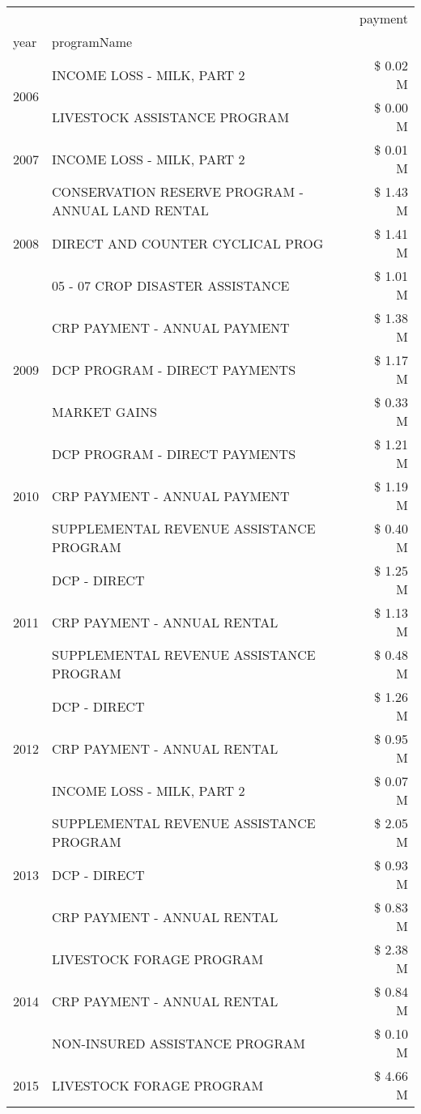 \begin{tabular}{llr}
\toprule
 &  & payment \\
year & programName &  \\
\midrule
\multirow[t]{2}{*}{2006} & INCOME LOSS - MILK, PART 2 & \$ 0.02 M \\
 & LIVESTOCK ASSISTANCE PROGRAM & \$ 0.00 M \\
\cline{1-3}
2007 & INCOME LOSS - MILK, PART 2 & \$ 0.01 M \\
\cline{1-3}
\multirow[t]{3}{*}{2008} & CONSERVATION RESERVE PROGRAM - ANNUAL LAND RENTAL & \$ 1.43 M \\
 & DIRECT AND COUNTER CYCLICAL PROG & \$ 1.41 M \\
 & 05 - 07 CROP DISASTER ASSISTANCE & \$ 1.01 M \\
\cline{1-3}
\multirow[t]{3}{*}{2009} & CRP PAYMENT - ANNUAL PAYMENT & \$ 1.38 M \\
 & DCP PROGRAM - DIRECT PAYMENTS & \$ 1.17 M \\
 & MARKET GAINS & \$ 0.33 M \\
\cline{1-3}
\multirow[t]{3}{*}{2010} & DCP PROGRAM - DIRECT PAYMENTS & \$ 1.21 M \\
 & CRP PAYMENT - ANNUAL PAYMENT & \$ 1.19 M \\
 & SUPPLEMENTAL REVENUE ASSISTANCE PROGRAM & \$ 0.40 M \\
\cline{1-3}
\multirow[t]{3}{*}{2011} & DCP - DIRECT & \$ 1.25 M \\
 & CRP PAYMENT - ANNUAL RENTAL & \$ 1.13 M \\
 & SUPPLEMENTAL REVENUE ASSISTANCE PROGRAM & \$ 0.48 M \\
\cline{1-3}
\multirow[t]{3}{*}{2012} & DCP - DIRECT & \$ 1.26 M \\
 & CRP PAYMENT - ANNUAL RENTAL & \$ 0.95 M \\
 & INCOME LOSS - MILK, PART 2 & \$ 0.07 M \\
\cline{1-3}
\multirow[t]{3}{*}{2013} & SUPPLEMENTAL REVENUE ASSISTANCE PROGRAM & \$ 2.05 M \\
 & DCP - DIRECT & \$ 0.93 M \\
 & CRP PAYMENT - ANNUAL RENTAL & \$ 0.83 M \\
\cline{1-3}
\multirow[t]{3}{*}{2014} & LIVESTOCK FORAGE PROGRAM & \$ 2.38 M \\
 & CRP PAYMENT - ANNUAL RENTAL & \$ 0.84 M \\
 & NON-INSURED ASSISTANCE PROGRAM & \$ 0.10 M \\
\cline{1-3}
\multirow[t]{3}{*}{2015} & LIVESTOCK FORAGE PROGRAM & \$ 4.66 M \\

\end{tabular}
